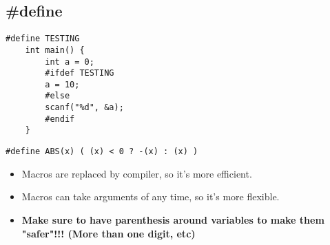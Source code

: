 \documentclass{article}
\begin{document}
\subsection{\#define}
\begin{lstlisting}[style=CStyle]
    #define TESTING
    int main() {
        int a = 0;
        #ifdef TESTING
        a = 10;
        #else
        scanf("%d", &a);
        #endif
    }
\end{lstlisting}
\begin{lstlisting}[style=CStyle]
    #define ABS(x) ( (x) < 0 ? -(x) : (x) )
\end{lstlisting}
\begin{itemize}
    \item Macros are replaced by compiler, so it's more efficient.
    \item Macros can take arguments of any time, so it's more flexible.
    \item \textbf{Make sure to have parenthesis around variables to make them "safer"!!! (More than one digit, etc)}
\end{itemize}
\end{document}
